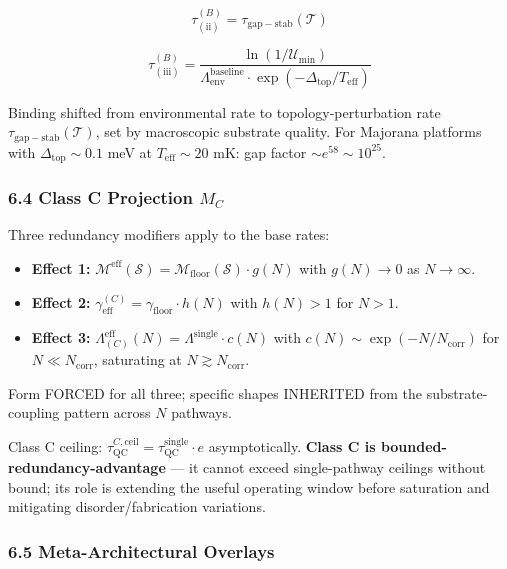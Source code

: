 \documentclass[
  11pt,
  a4paper,
]{article}
\providecommand{\tightlist}{%
  \setlength{\itemsep}{0pt}\setlength{\parskip}{0pt}}
\begin{document}
\[
\tau_{(\mathrm{ii})}^{(B)} = \tau_{\mathrm{gap-stab}}(\mathcal{T})
\]

\[
\tau_{(\mathrm{iii})}^{(B)} = \frac{\ln(1/\mathcal{U}_{\mathrm{min}})}{\Lambda_{\mathrm{env}}^\mathrm{baseline}\cdot\exp(-\Delta_{\mathrm{top}}/T_{\mathrm{eff}})}
\]

Binding shifted from environmental rate to topology-perturbation rate
\(\tau_{\mathrm{gap-stab}}(\mathcal{T})\), set by macroscopic substrate
quality. For Majorana platforms with \(\Delta_{\mathrm{top}} \sim 0.1\)
meV at \(T_{\mathrm{eff}} \sim 20\) mK: gap factor
\(\sim e^{58} \sim 10^{25}\).

\subsubsection{\texorpdfstring{6.4 Class C Projection
\(M_C\)}{6.4 Class C Projection M\_C}}\label{class-c-projection-m_c}

Three redundancy modifiers apply to the base rates:

\begin{itemize}
\tightlist
\item
  \textbf{Effect 1:}
  \(\mathcal{M}^{\mathrm{eff}}(\mathcal{S}) = \mathcal{M}_{\mathrm{floor}}(\mathcal{S})\cdot g(N)\)
  with \(g(N) \to 0\) as \(N \to \infty\).
\item
  \textbf{Effect 2:}
  \(\gamma_{\mathrm{eff}}^{(C)} = \gamma_{\mathrm{floor}}\cdot h(N)\)
  with \(h(N) > 1\) for \(N > 1\).
\item
  \textbf{Effect 3:}
  \(\Lambda^{\mathrm{eff}}_{(C)}(N) = \Lambda^{\mathrm{single}}\cdot c(N)\)
  with \(c(N) \sim \exp(-N/N_{\mathrm{corr}})\) for
  \(N \ll N_{\mathrm{corr}}\), saturating at
  \(N \gtrsim N_{\mathrm{corr}}\).
\end{itemize}

Form FORCED for all three; specific shapes INHERITED from the
substrate-coupling pattern across \(N\) pathways.

Class C ceiling:
\(\tau_{\mathrm{QC}}^{C,\mathrm{ceil}} = \tau_{\mathrm{QC}}^{\mathrm{single}}\cdot e\)
asymptotically. \textbf{Class C is bounded-redundancy-advantage} --- it
cannot exceed single-pathway ceilings without bound; its role is
extending the useful operating window before saturation and mitigating
disorder/fabrication variations.

\subsubsection{6.5 Meta-Architectural
Overlays}\label{meta-architectural-overlays}
\end{document}
